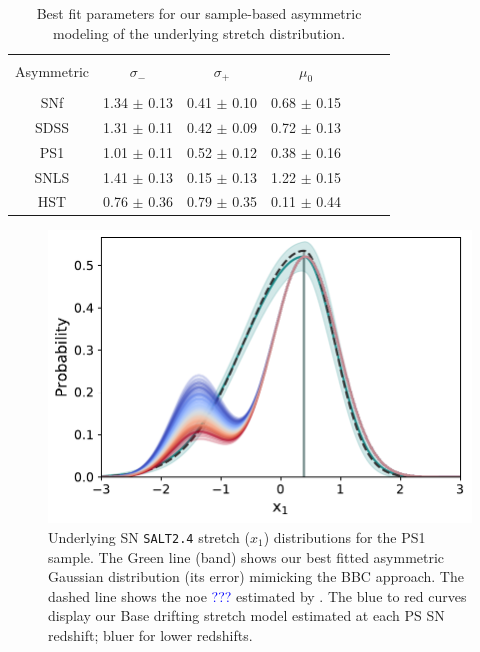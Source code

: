 \documentclass[]{aa} %
\newcommand{\yc}[1]{{\textcolor{blue}{#1}}}
\begin{document}
\begin{table}
    \centering
    \caption{Best fit parameters for our sample-based asymmetric modeling of the
    underlying stretch distribution.}
    \label{tab:bbc}
    \begin{tabular}{c c c c c c c}\hline\hline\\[-0.8em]
    Asymmetric & $\sigma_{-}$ & $\sigma_{+}$ & $\mu_0$ \\\hline\\[-0.8em]
    SNf &  1.34 $\pm$ 0.13 & 0.41 $\pm$ 0.10 & 0.68 $\pm$ 0.15\\[0.15em]
    SDSS & 1.31 $\pm$ 0.11 & 0.42 $\pm$ 0.09 & 0.72 $\pm$ 0.13 \\[0.15em]
    PS1 &  1.01 $\pm$ 0.11 & 0.52 $\pm$ 0.12 & 0.38 $\pm$ 0.16 \\[0.15em]
    SNLS & 1.41 $\pm$ 0.13 & 0.15 $\pm$ 0.13 & 1.22 $\pm$ 0.15 \\[0.15em]
    HST &  0.76 $\pm$ 0.36 & 0.79 $\pm$ 0.35 & 0.11 $\pm$ 0.44 \\\hline\hline
    \end{tabular}
\end{table}

\begin{figure}
    \centering
    \includegraphics[width=\linewidth]{Article_figures/bbc_comp_PS1.pdf}
    \caption{Underlying SN \textsc{\texttt{SALT2.4}} stretch ($x_1$)
        distributions for the PS1 sample. The Green line (band) shows our best
        fitted asymmetric Gaussian distribution (its error) mimicking the BBC
        approach. The dashed line shows the noe \yc{???} estimated by
    \cite{scolnic2018a}. The blue to red curves display our Base drifting
stretch model estimated at each PS SN redshift; bluer for lower redshifts.}
    \label{fig:bbc_pdf_ps1}
\end{figure}
\end{document}
